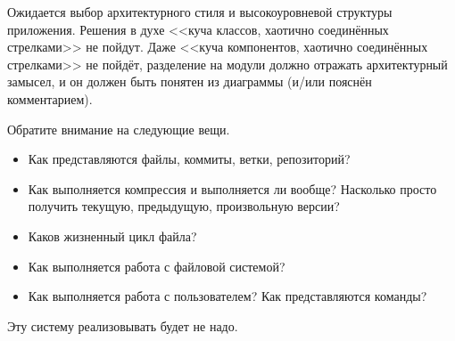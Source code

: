 \documentclass{../../text-style}
\begin{document}
Ожидается выбор архитектурного стиля и высокоуровневой структуры приложения. Решения в духе <<куча классов, хаотично соединённых стрелками>> не пойдут. Даже <<куча компонентов, хаотично соединённых стрелками>> не пойдёт, разделение на модули должно отражать архитектурный замысел, и он должен быть понятен из диаграммы (и/или пояснён комментарием).

Обратите внимание на следующие вещи.

\begin{itemize}
    \item Как представляются файлы, коммиты, ветки, репозиторий?
    \item Как выполняется компрессия и выполняется ли вообще? Насколько просто получить текущую, предыдущую, произвольную версии?
    \item Каков жизненный цикл файла?
    \item Как выполняется работа с файловой системой?
    \item Как выполняется работа с пользователем? Как представляются команды?
\end{itemize}

Эту систему реализовывать будет не надо.
\end{document}
